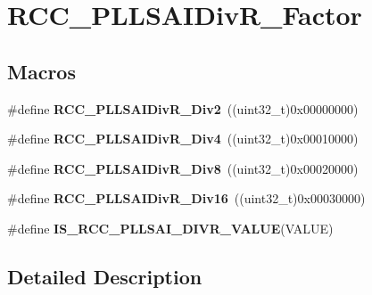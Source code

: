 \hypertarget{group___r_c_c___p_l_l_s_a_i_div_r___factor}{}\section{R\+C\+C\+\_\+\+P\+L\+L\+S\+A\+I\+Div\+R\+\_\+\+Factor}
\label{group___r_c_c___p_l_l_s_a_i_div_r___factor}
\subsection*{Macros}
\begin{DoxyCompactItemize}
\item 
\mbox{\label{group___r_c_c___p_l_l_s_a_i_div_r___factor_ga61843bfd97c4bb40ccc9116bd7cfad4e}} 
\#define {\bfseries R\+C\+C\+\_\+\+P\+L\+L\+S\+A\+I\+Div\+R\+\_\+\+Div2}~((uint32\+\_\+t)0x00000000)
\item 
\mbox{\label{group___r_c_c___p_l_l_s_a_i_div_r___factor_gaadf28edb7192566f518f0ecaa756ba00}} 
\#define {\bfseries R\+C\+C\+\_\+\+P\+L\+L\+S\+A\+I\+Div\+R\+\_\+\+Div4}~((uint32\+\_\+t)0x00010000)
\item 
\mbox{\label{group___r_c_c___p_l_l_s_a_i_div_r___factor_ga603497eb07550fdb590ce54c1963e140}} 
\#define {\bfseries R\+C\+C\+\_\+\+P\+L\+L\+S\+A\+I\+Div\+R\+\_\+\+Div8}~((uint32\+\_\+t)0x00020000)
\item 
\mbox{\label{group___r_c_c___p_l_l_s_a_i_div_r___factor_ga8cf39f72ca49f5057ee154cfaeafa1c1}} 
\#define {\bfseries R\+C\+C\+\_\+\+P\+L\+L\+S\+A\+I\+Div\+R\+\_\+\+Div16}~((uint32\+\_\+t)0x00030000)
\item 
\#define {\bfseries I\+S\+\_\+\+R\+C\+C\+\_\+\+P\+L\+L\+S\+A\+I\+\_\+\+D\+I\+V\+R\+\_\+\+V\+A\+L\+UE}(V\+A\+L\+UE)
\end{DoxyCompactItemize}


\subsection{Detailed Description}


